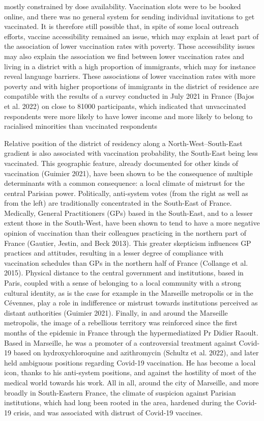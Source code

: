 \documentclass[
]{article}
\begin{document}
mostly constrained by dose availability. Vaccination slots were to be
booked online, and there was no general system for sending individual
invitations to get vaccinated. It is therefore still possible that, in
spite of some local outreach efforts, vaccine accessibility remained an
issue, which may explain at least part of the association of lower
vaccination rates with poverty. These accessibility issues may also
explain the association we find between lower vaccination rates and
living in a district with a high proportion of immigrants, which may for
instance reveal language barriers. These associations of lower
vaccination rates with more poverty and with higher proportions of
immigrants in the district of residence are compatible with the results
of a survey conducted in July 2021 in France (Bajos et al. 2022) on
close to 81000 participants, which indicated that unvaccinated
respondents were more likely to have lower income and more likely to
belong to racialised minorities than vaccinated respondents

Relative position of the district of residency along a
North-West--South-East gradient is also associated with vaccination
probability, the South-East being less vaccinated. This geographic
feature, already documented for other kinds of vaccination (Guimier
2021), have been shown to be the consequence of multiple determinants
with a common consequence: a local climate of mistrust for the central
Parisian power. Politically, anti-system votes (from the right as well
as from the left) are traditionally concentrated in the South-East of
France. Medically, General Practitioners (GPs) based in the South-East,
and to a lesser extent those in the South-West, have been shown to tend
to have a more negative opinion of vaccination than their colleagues
practicing in the northern part of France (Gautier, Jestin, and Beck
2013). This greater skepticism influences GP practices and attitudes,
resulting in a lesser degree of compliance with vaccination schedules
than GPs in the northern half of France (Collange et al. 2015). Physical
distance to the central government and institutions, based in Paris,
coupled with a sense of belonging to a local community with a strong
cultural identity, as is the case for example in the Marseille
metropolis or in the Cévennes, play a role in indifference or mistrust
towards institutions perceived as distant authorities (Guimier 2021).
Finally, in and around the Marseille metropolis, the image of a
rebellious territory was reinforced since the first months of the
epidemic in France through the hypermediatized Pr Didier Raoult. Based
in Marseille, he was a promoter of a controversial treatment against
Covid-19 based on hydroxychloroquine and azithromycin (Schultz et al.
2022), and later held ambiguous positions regarding Covid-19
vaccination. He has become a local icon, thanks to his anti-system
positions, and against the hostility of most of the medical world
towards his work. All in all, around the city of Marseille, and more
broadly in South-Eastern France, the climate of suspicion against
Parisian institutions, which had long been rooted in the area, hardened
during the Covid-19 crisis, and was associated with distrust of Covid-19
vaccines.
\end{document}
